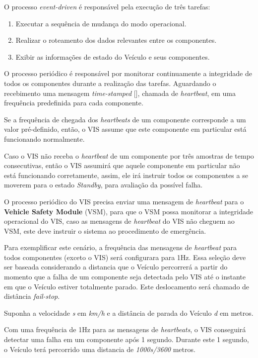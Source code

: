 \documentclass[conference]{IEEEtran}
\begin{document}
O processo \textit{event-driven} é responsável pela execução de três tarefas: 
\begin{enumerate}
	\item Executar a sequência de mudança do modo operacional.
	\item Realizar o roteamento dos dados relevantes entre os componentes.
	\item Exibir as informações de estado do Veículo e seus componentes.
\end{enumerate}

O processo periódico é responsável por monitorar continuamente a integridade de todos os componentes durante a realização das tarefas. Aguardando o recebimento uma mensagem \textit{time-stamped} [], chamada de \textit{heartbeat}, em uma frequência predefinida para cada componente.

Se a frequência de chegada dos \textit{heartbeats} de um componente corresponde a um valor pré-definido, então, o VIS assume que este componente em particular está funcionando normalmente.

Caso o VIS não receba o \textit{heartbeat} de um componente por três amostras de tempo consecutivas, então o VIS assumirá que aquele componente em particular não está funcionando corretamente, assim, ele irá instruir todos os componentes a se moverem para o estado \textit{Standby}, para avaliação da possível falha.

O processo periódico do VIS precisa enviar uma mensagem de \textit{heartbeat} para o \textbf{Vehicle Safety Module} (VSM), para que o VSM possa monitorar a integridade operacional do VIS, caso as mensagens de \textit{heartbeat} do VIS não cheguem ao VSM, este deve instruir o sistema ao procedimento de emergência.

Para exemplificar este cenário, a frequência das mensagens de \textit{heartbeat} para todos componentes (exceto o VIS) será configurara para 1Hz. Essa seleção deve ser baseada considerando a distancia que o Veículo percorrerá a partir do momento que a falha de um componente seja detectada pelo VIS até o instante em que o Veículo estiver totalmente parado. Este deslocamento será chamado de distância \textit{fail-stop}.

Suponha a velocidade \textit{s} em \textit{km/h} e a distância de parada do Veículo \textit{d} em metros.

Com uma frequência de 1Hz para as mensagens de \textit{heartbeats}, o VIS conseguirá detectar uma falha em um componente após 1 segundo. Durante este 1 segundo, o Veículo terá percorrido uma distancia de \textit{1000s/3600} metros.	
\end{document}
